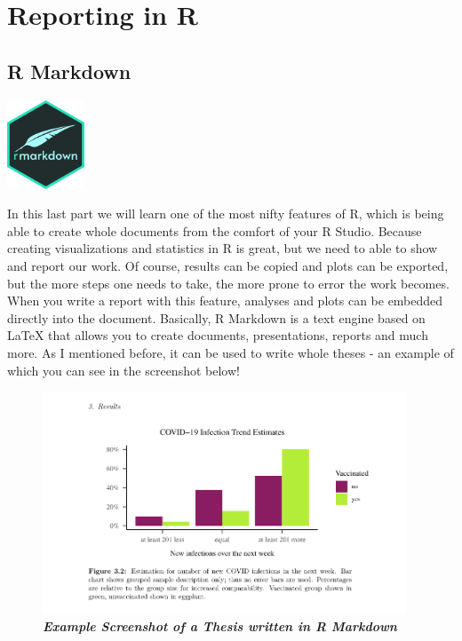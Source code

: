 \documentclass[
]{book}
\begin{document}
\part{Reporting in R}\label{part-reporting-in-r}

\chapter{R Markdown}\label{r-markdown}

\includegraphics[width=\textwidth,height=1.04167in]{./img/rmd.png}

In this last part we will learn one of the most nifty features of R, which is being able to create whole documents from the comfort of your R Studio.
Because creating visualizations and statistics in R is great, but we need to able to show and report our work.
Of course, results can be copied and plots can be exported, but the more steps one needs to take, the more prone to error the work becomes. When you write a report with this feature, analyses and plots can be embedded directly into the document.
Basically, R Markdown is a text engine based on LaTeX that allows you to create documents, presentations, reports and much more.
As I mentioned before, it can be used to write whole theses - an example of which you can see in the screenshot below!

\begin{figure}
\centering
\includegraphics[width=\textwidth,height=2.60417in]{./img/MArmdex.png}
\caption{\emph{\textbf{Example Screenshot of a Thesis written in R Markdown}}}
\end{figure}
\end{document}
